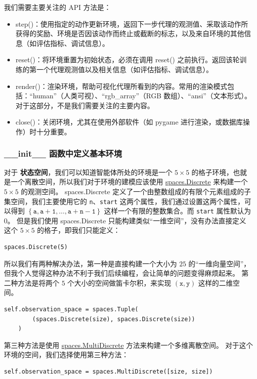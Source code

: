 我们需要主要关注的 API 方法是：
\begin{itemize}
    \item \textsf{step()}：使用指定的动作更新环境，返回下一步代理的观测值、采取该动作所获得的奖励、环境是否因该动作而终止或截断的标志，以及来自环境的其他信息（如评估指标、调试信息）。
    \item \textsf{reset()}：将环境重置为初始状态，必须在调用 \textsf{reset()} 之前执行。返回该轮训练的第一个代理观测值以及相关信息（如评估指标、调试信息）。
    \item \textsf{render()}：渲染环境，帮助可视化代理所看到的内容。常用的渲染模式包括：“human”（人类可视）、“rgb\_array”（RGB 数组）、“ansi”（文本形式）。对于这部分，不是我们需要关注的主要内容。
    \item \textsf{close()}：关闭环境，尤其在使用外部软件（如 pygame 进行渲染，或数据库操作）时十分重要。
\end{itemize}

\subsubsection{\textsf{\_\_init\_\_} 函数中定义基本环境}

对于 \textbf{状态空间}，我们可以知道智能体所处的环境是一个 \(5 \times 5\) 的格子环境，也就是一个离散空间，所以我们对于环境的建模应该使用 \href{https://gymnasium.farama.org/api/spaces/fundamental/#gymnasium.spaces.Discrete}{\textsf{spaces.Discrete}} 来构建一个 \(5 \times 5\) 的观测空间。
\textsf{spaces.Discrete} 定义了一个由整数组成的有限个元素组成的子集空间，我们主要使用它的 \texttt{n}、\texttt{start} 这两个属性，我们通过设置这两个属性，可以得到 \(\left\{ \mathtt{a}, \mathtt{a+1}, \dots, \mathtt{a+n-1} \right\}\) 这样一个有限的整数集合。而 \texttt{start} 属性默认为 \(0\)。
但是我们使用 \textsf{spaces.Discrete} 只能构建类似“一维空间”，没有办法直接定义这个 \(5 \times 5\) 的格子，即我们只能定义：
\begin{verbatim}
spaces.Discrete(5)
\end{verbatim}

所以我们有两种解决办法，第一种是直接构建一个大小为 \(25\) 的“一维向量空间”，但我个人觉得这种办法不利于我们后续编程，会让简单的问题变得麻烦起来。
第二种方法是将两个 \(5\) 个大小的空间做笛卡尔积，来实现 \(\left(\texttt{x}, \texttt{y}\right)\) 这样的二维空间。
\begin{verbatim}
self.observation_space = spaces.Tuple(
        (spaces.Discrete(size), spaces.Discrete(size))
    )
\end{verbatim}
第三种方法是使用 \href{https://gymnasium.farama.org/api/spaces/composite/#gymnasium.spaces.MultiDiscrete}{\textsf{spaces.MultiDiscrete}} 方法来构建一个多维离散空间。
对于这个环境的空间，我们选择使用第三种方法：
\begin{verbatim}
self.observation_space = spaces.MultiDiscrete([size, size])
\end{verbatim}

